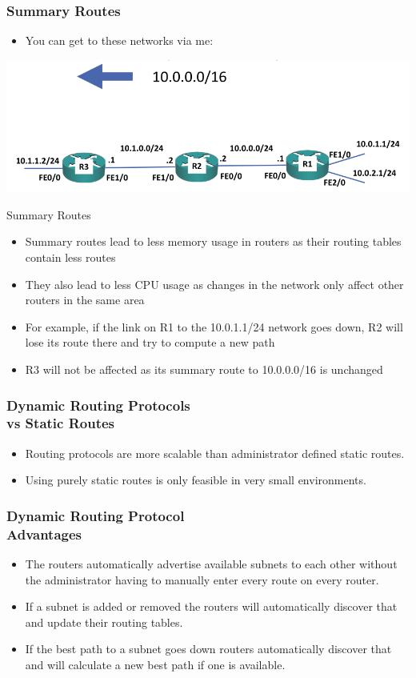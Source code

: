 \documentclass[pdflatex,compress,mathserif]{beamer}
\begin{document}
\begin{frame}
	\frametitle{Summary Routes}
	\begin{itemize}
		\item You can get to these networks via me:
	\end{itemize}
	\begin{center}
		\includegraphics[width=\linewidth]{img/img05}
	\end{center}
\end{frame}

\begin{frame}{Summary Routes}
	\begin{itemize}
		\item Summary routes lead to less memory usage in routers as their routing tables contain less routes
		\item They also lead to less CPU usage as changes in the network only affect
other routers in the same area
		\item For example, if the link on R1 to the 10.0.1.1/24 network goes down, R2
will lose its route there and try to compute a new path
		\item R3 will not be affected as its summary route to 10.0.0.0/16 is unchanged
	\end{itemize}
\end{frame}

\begin{frame}
	\frametitle{Dynamic Routing Protocols\\vs Static Routes}
	\begin{itemize}
		\item Routing protocols are more scalable than administrator defined static
routes.
		\item Using purely static routes is only feasible in very small environments.
	\end{itemize}
\end{frame}

\begin{frame}
	\frametitle{Dynamic Routing Protocol\\Advantages}
	\begin{itemize}
		\item The routers automatically advertise available subnets to each other
without the administrator having to manually enter every route on every
		router.
		\item If a subnet is added or removed the routers will automatically discover
that and update their routing tables.
		\item If the best path to a subnet goes down routers automatically discover
that and will calculate a new best path if one is available.
	\end{itemize}
\end{frame}
\end{document}
